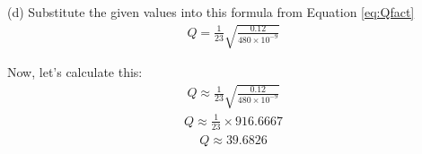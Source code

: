 \documentclass[journal,12pt,twocolumn]{IEEEtran}
\theoremstyle{remark}
\begin{document}
(d)
Substitute the given values into this formula from Equation \eqref{eq:Qfact}
\begin{align}
    Q = \frac{1}{23} \sqrt{\frac{0.12}{480 \times 10^{-9}}} 
\end{align}

Now, let's calculate this:
\begin{align}
    Q \approx \frac{1}{23} \sqrt{\frac{0.12}{480 \times 10^{-9}}} 
\end{align}
\begin{align}
    Q \approx \frac{1}{23} \times 916.6667 
\end{align}
\begin{align}
    Q \approx 39.6826 
\end{align}
\end{document}
